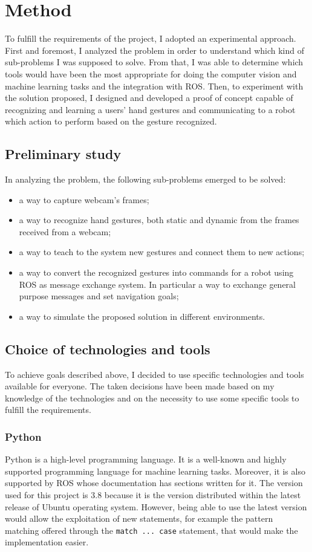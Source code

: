 \documentclass[../thesis.tex]{subfiles}
\begin{document}
\chapter{Method}\label{cap:methods}
To fulfill the requirements of the project, I adopted an experimental approach. First and foremost, I analyzed the problem in order to understand which kind of sub-problems I was supposed to solve. From that, I was able to determine which tools would have been the most appropriate for doing the computer vision and machine learning tasks and the integration with \gls{ROS}. Then, to experiment with the solution proposed, I designed and developed a proof of concept capable of recognizing and learning a users’ hand gestures and communicating to a robot which action to perform based on the gesture recognized.

\section{Preliminary study}
In analyzing the problem, the following sub-problems emerged to be solved:
\begin{itemize}
    \item a way to capture webcam's frames;
    \item a way to recognize hand gestures, both static and dynamic from the frames received from a webcam;
    \item a way to teach to the system new gestures and connect them to new actions;
    \item a way to convert the recognized gestures into commands for a robot using \gls{ROS} as message exchange system. In particular a way to exchange general purpose messages and set navigation goals;
    \item a way to simulate the proposed solution in different environments.
\end{itemize}

\section{Choice of technologies and tools}\label{sec:technologies_and_tolls}
To achieve goals described above, I decided to use specific technologies and tools available for everyone. The taken decisions have been made based on my knowledge of the technologies and on the necessity to use some specific tools to fulfill the requirements.
\subsection{Python}
Python is a high-level programming language. It is a well-known and highly supported programming language for machine learning tasks. Moreover, it is also supported by \acrshort{ROS} whose documentation has sections written for it. The version used for this project is 3.8 because it is the version distributed within the latest release of Ubuntu operating system. However, being able to use the latest version would allow the exploitation of new statements, for example the pattern matching offered through the \texttt{match ... case} statement, that would make the implementation easier.
\end{document}
